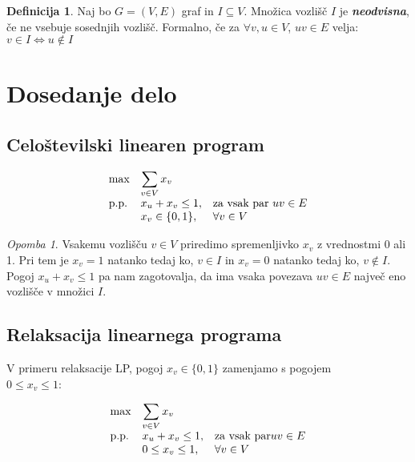 \documentclass[a4paper, 12 pt]{article}
\theoremstyle{plain}
\theoremstyle{definition}
\newtheorem{definicija}{Definicija}
\theoremstyle{remark}
\newtheorem{opomba}{Opomba}
\begin{document}
\begin{definicija}Naj bo $G = (V, E)$ graf in $I \subseteq V$. Množica vozlišč $I$ je \textbf{\textit{neodvisna}}, če ne vsebuje sosednjih vozlišč. 
\newline Formalno, če za $\forall v, u \in V$, $uv \in E$ velja: $v \in I \Leftrightarrow  u \notin I$ \end{definicija}




\section{Dosedanje delo}
\subsection{Celoštevilski linearen program}

\begin{equation*}
\begin{array}{ll@{}ll}
\text{max}  & \displaystyle\sum\limits_{v\in V} x_v &&\\
\text{p.p.}	 & x_u + x_v \leq 1,		 			&&\text{za vsak par } uv \in E \\
                 & x_v \in \{0,1\}, 	              			&&\forall v \in V
\end{array}
\end{equation*}

\begin{opomba}
Vsakemu vozlišču $v \in V$ priredimo spremenljivko $x_v$ z vrednostmi 0 ali 1. Pri tem je $x_v = 1$ natanko tedaj ko, $v \in I$ in $x_v = 0$ natanko tedaj ko, $v \notin I$. Pogoj $x_u + x_v \leq 1$ pa nam zagotovalja, da ima vsaka povezava $uv \in E$ največ eno vozlišče v množici $I$.
\end{opomba}



\subsection{Relaksacija linearnega programa}
V primeru relaksacije LP, pogoj $x_v \in \{0, 1\}$ zamenjamo s pogojem\\ $0 \leq x_v \leq 1$:

\begin{equation*}
\begin{array}{ll@{}ll}
\text{max}  	& \displaystyle\sum\limits_{v\in V} x_v &&\\
\text{p.p.}	& x_u + x_v \leq 1,		 				&&\text{za vsak par} uv \in E \\
                 	& 0 \leq x_v \leq 1, 	              			&&\forall v \in V
\end{array}
\end{equation*}
\end{document}
